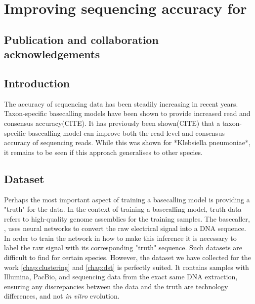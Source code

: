 \chapter{Improving \ont{} sequencing accuracy for \mtb{}}
\label{chap:tubby}

\setcounter{section}{-1}
\section{Publication and collaboration acknowledgements}
\label{sec:ch4-acknowledge}

\section{Introduction}
The accuracy of \ont{} sequencing data has been steadily increasing in recent years. 
Taxon-specific \ont{} basecalling models have been shown to provide increased read and consensus accuracy(CITE).
It has previously been shown(CITE) that a taxon-specific basecalling model can improve both the read-level and consensus accuracy of \ont{} sequencing reads. While this was shown for *Klebsiella pneumoniae*, it remains to be seen if this approach generalises to other species.

\section{Dataset}
\label{sec:tubby-data}

 Perhaps the most important aspect of training a basecalling model is providing a "truth" for the data. In the context of training a \ont{} basecalling model, truth data refers to high-quality genome assemblies for the training samples. The \ont{} basecaller, \guppy{}, uses neural networks to convert the raw electrical signal into a DNA sequence. In order to train the network in how to make this inference it is necessary to label the raw signal with its corresponding "truth" sequence. Such datasets are difficult to find for certain species. However, the dataset we have collected for the work \autoref{chap:clustering} and \autoref{chap:dst} is perfectly suited. It contains samples with Illumina, PacBio, and \ont{} sequencing data from the exact same DNA extraction, ensuring any discrepancies between the \ont{} data and the truth are technology differences, and not \textit{in vitro} evolution. 

